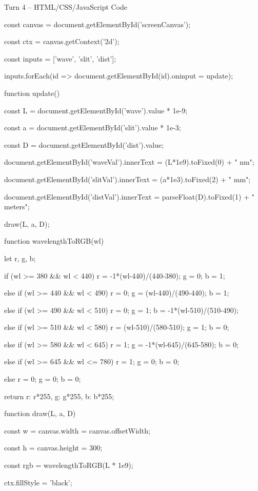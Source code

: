\documentclass[10pt,a4paper]{article}
\begin{document}
\begin{htmlcodebox}{Turn 4 -- HTML/CSS/JavaScript Code}
{{{{{const canvas = document.getElementById('screenCanvas');

const ctx = canvas.getContext('2d');

const inputs = ['wave', 'slit', 'dist'];

inputs.forEach(id => document.getElementById(id).oninput = update);

function update() {

    const L = document.getElementById('wave').value * 1e-9;

    const a = document.getElementById('slit').value * 1e-3;

    const D = document.getElementById('dist').value;

    document.getElementById('waveVal').innerText = (L*1e9).toFixed(0) + " nm";

    document.getElementById('slitVal').innerText = (a*1e3).toFixed(2) + " mm";

    document.getElementById('distVal').innerText = parseFloat(D).toFixed(1) + " meters";

    draw(L, a, D);

}

function wavelengthToRGB(wl) {


    let r, g, b;

    if (wl >= 380 && wl < 440) { r = -1*(wl-440)/(440-380); g = 0; b = 1; }

    else if (wl >= 440 && wl < 490) { r = 0; g = (wl-440)/(490-440); b = 1; }

    else if (wl >= 490 && wl < 510) { r = 0; g = 1; b = -1*(wl-510)/(510-490); }

    else if (wl >= 510 && wl < 580) { r = (wl-510)/(580-510); g = 1; b = 0; }

    else if (wl >= 580 && wl < 645) { r = 1; g = -1*(wl-645)/(645-580); b = 0; }

    else if (wl >= 645 && wl <= 780) { r = 1; g = 0; b = 0; }

    else { r = 0; g = 0; b = 0; }

    return {r: r*255, g: g*255, b: b*255};

}

function draw(L, a, D) {

    const w = canvas.width = canvas.offsetWidth;

    const h = canvas.height = 300;

    const rgb = wavelengthToRGB(L * 1e9);

    ctx.fillStyle = 'black';

}}}}}}
\end{htmlcodebox}
\end{document}
